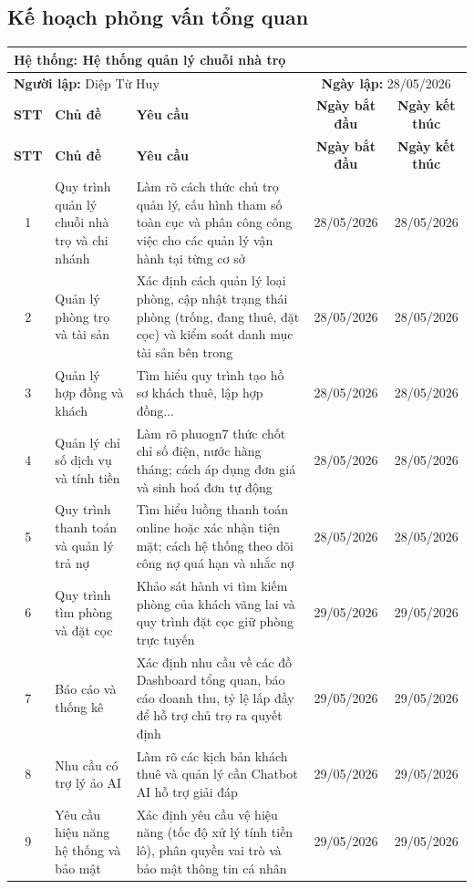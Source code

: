 \documentclass[a4paper,oneside]{report}
\begin{document}
\subsection{Kế hoạch phỏng vấn tổng quan}
\begin{longtable}{|c|p{2.5cm}|p{5.5cm}|c|c|}
\hline
\multicolumn{5}{|l|}{\textbf{Hệ thống:} Hệ thống quản lý chuỗi nhà trọ} \\ \hline
\multicolumn{3}{|l|}{\textbf{Người lập:} Diệp Từ Huy} & \multicolumn{2}{c|}{{\textbf{Ngày lập:} 28/05/2026}} \\ \hline
\textbf{STT} & \centering\textbf{Chủ đề} & \centering\textbf{Yêu cầu} & \textbf{Ngày bắt đầu} & \textbf{Ngày kết thúc} \\ \hline
\endfirsthead

\hline
\textbf{STT} & \centering\textbf{Chủ đề} & \centering\textbf{Yêu cầu} & \textbf{Ngày bắt đầu} & \textbf{Ngày kết thúc} \\ \hline
\endhead

\hline
\endfoot
\hline
\endlastfoot

1 & Quy trình quản lý chuỗi nhà trọ và chi nhánh & Làm rõ cách thức chủ trọ quản lý, cấu hình tham số toàn cục và phân công công việc cho các quản lý vận hành tại từng cơ sở & 28/05/2026 & 28/05/2026 \\ \hline
2 & Quản lý phòng trọ và tài sản & Xác định cách quản lý loại phòng, cập nhật trạng thái phòng (trống, đang thuê, đặt cọc) và kiểm soát danh mục tài sản bên trong & 28/05/2026 & 28/05/2026 \\ \hline
3 & Quản lý hợp đồng và khách & Tìm hiểu quy trình tạo hồ sơ khách thuê, lập hợp đồng... & 28/05/2026 & 28/05/2026 \\ \hline
4 & Quản lý chỉ số dịch vụ và tính tiền & Làm rõ phuogn7 thức chốt chỉ số điện, nước hàng tháng; cách áp dụng đơn giá và sinh hoá đơn tự động & 28/05/2026 & 28/05/2026 \\ \hline
5 & Quy trình thanh toán và quản lý trả nợ & Tìm hiểu luồng thanh toán online hoặc xác nhận tiện mặt; cách hệ thống theo dõi công nợ quá hạn và nhắc nợ & 28/05/2026 & 28/05/2026 \\ \hline
6 & Quy trình tìm phòng và đặt cọc & Khảo sát hành vi tìm kiếm phòng của khách vãng lai và quy trình đặt cọc giữ phòng trực tuyến & 29/05/2026 & 29/05/2026 \\ \hline
7 & Báo cáo và thống kê & Xác định nhu cầu về các đồ Dashboard tổng quan, báo cáo doanh thu, tỷ lệ lấp đầy để hỗ trợ chủ trọ ra quyết định & 29/05/2026 & 29/05/2026 \\ \hline
8 & Nhu cầu có trợ lý ảo AI & Làm rõ các kịch bản khách thuê và quản lý cần Chatbot AI hỗ trợ giải đáp & 29/05/2026 & 29/05/2026 \\ \hline
9 & Yêu cầu hiệu năng hệ thống và bảo mật & Xác định yêu cầu vệ hiệu năng (tốc độ xử lý tính tiền lô), phân quyền vai trò và bảo mật thông tin cá nhân & 29/05/2026 & 29/05/2026 \\ \hline

\end{longtable}
\end{document}
